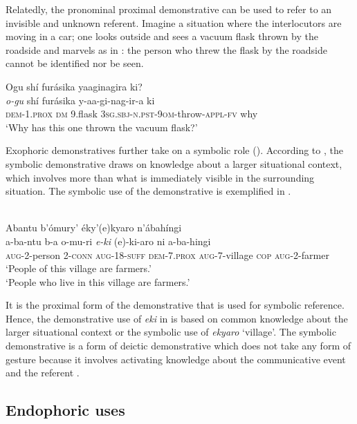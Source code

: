 \documentclass[output=paper 		  ]{langscibook}
\begin{document}
Relatedly, the pronominal proximal demonstrative can be used to refer to an invisible and unknown referent. Imagine a situation where the interlocutors are moving in a car; one looks outside and sees a vacuum flask thrown by the roadside and marvels as in : the person who threw the flask by the roadside cannot be identified nor be seen.

\ea%
    \label{ex:asiimwe:48}
    Ogu shí furásika yaaginagira ki?\\
  \gll \emph{o-gu}  shí  furásika  y-aa-gi-nag-ir-a  ki\\
\textsc{dem-1.prox}  \textsc{dm}  9.flask  \textsc{3sg.sbj-n.pst-9om}{}-throw-\textsc{appl-fv}  why\\
\glt ‘Why has this one thrown the vacuum flask?’
\z

Exophoric demonstratives further take on a symbolic role (\citealt{Fillmore1997, Levinson2004}). According to \citet[94]{Diessel1999}, the symbolic demonstrative draws on knowledge about a larger situational context, which involves more than what is immediately visible in the surrounding situation. The symbolic use of the demonstrative is exemplified in .

\ea%
    \label{ex:asiimwe:49} \citet[204]{Asiimwe2014}\\
    Abantu b’ómury’ éky’(e)kyaro n’ábahíngi\\
\gll a-ba-ntu  b-a  o-mu-ri  \emph{e-ki}  (e)-ki-aro  ni  a-ba-hingi\\
  \textsc{aug}{}-2-person  2-\textsc{conn}  \textsc{aug}{}-18-\textsc{suff}  \textsc{dem}{}-7.\textsc{prox}  \textsc{aug}{}-7-village  \textsc{cop}  \textsc{aug}{}-2-farmer\\
\glt ‘People of this village are farmers.’ \\
‘People who live in this village are farmers.’
\z

It is the proximal form of the demonstrative that is used for symbolic reference. Hence, the demonstrative use of \textit{eki} in  is based on common knowledge about the larger situational context or the symbolic use of \textit{ekyaro} ‘village’. The symbolic demonstrative is a form of deictic demonstrative which does not take any form of gesture because it involves activating knowledge about the communicative event and the referent \citep[94]{Diessel1999}.

\subsection{Endophoric uses}\label{sec:asiimwe:4.2}
\end{document}
